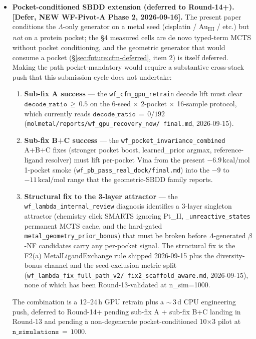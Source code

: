 \begin{itemize}
  \item \textbf{Pocket-conditioned SBDD extension
    (deferred to Round-14+).  [Defer, NEW WF-Pivot-A Phase 2,
    2026-09-16].}\label{sec:future:pb-pocket-sbdd}
    The present paper conditions the $\Lambda$-only generator on
    a metal seed (cisplatin / Au\textsubscript{III} / etc.) but
    \emph{not} on a protein pocket; the §4 measured cells are
    de novo typed-term MCTS without pocket conditioning, and
    the geometric generator that would consume a pocket
    (\S\ref{sec:future:cfm-deferred}, item 2) is itself
    deferred.  Making the path pocket-mandatory would require
    a substantive cross-stack push that this submission cycle
    does not undertake:
    \begin{enumerate}
      \item \textbf{Sub-fix A success} --- the
            \texttt{wf\_cfm\_gpu\_retrain} decode lift must
            clear $\texttt{decode\_ratio}\,\geq\,0.5$ on the
            6-seed $\times$ 2-pocket $\times$ 16-sample
            protocol, which currently reads
            $\texttt{decode\_ratio}\,=\,0/192$
            (\texttt{molmetal/reports/wf\_gpu\_recovery\_now/
            final.md}, 2026-09-15).
      \item \textbf{Sub-fix B+C success} --- the
            \texttt{wf\_pocket\_invariance\_combined} A+B+C
            fixes (stronger pocket boost, learned\_prior
            argmax, reference-ligand resolver) must lift
            per-pocket Vina from the present
            $-6.9\,\mathrm{kcal/mol}$ 1-pocket smoke
            (\texttt{wf\_pb\_pass\_real\_dock/final.md})
            into the $-9$ to $-11\,\mathrm{kcal/mol}$ range
            that the geometric-SBDD family reports.
      \item \textbf{Structural fix to the 3-layer
            attractor} --- the
            \texttt{wf\_lambda\_internal\_review} diagnosis
            identifies a 3-layer singleton attractor
            (chemistry click SMARTS ignoring Pt\_II,
            \texttt{\_unreactive\_states} permanent MCTS cache,
            and the hard-gated \texttt{metal\_geometry\_prior\_bonus})
            that must be broken before $\Lambda$-generated
            $\beta$-NF candidates carry any per-pocket signal.
            The structural fix is the F2(a) MetalLigandExchange
            rule shipped 2026-09-15 plus the diversity-bonus
            channel and the seed-exclusion metric split
            (\texttt{wf\_lambda\_fix\_full\_path\_v2/
            fix2\_scaffold\_aware.md}, 2026-09-15), none of
            which has been Round-13-validated at n\_sim=1000.
    \end{enumerate}
    The combination is a 12--24\,h GPU retrain plus a
    $\sim$\,3\,d CPU engineering push, deferred to Round-14+
    pending sub-fix A + sub-fix B+C landing in Round-13 and
    pending a non-degenerate pocket-conditioned 10$\times$3
    pilot at $\texttt{n\_simulations}\,=\,1000$.


\end{itemize}
